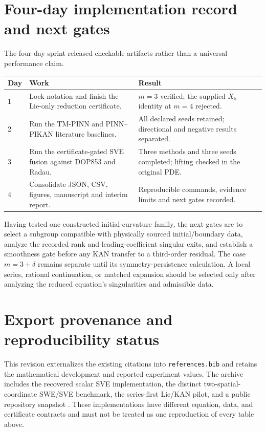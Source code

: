 \documentclass[11pt]{article}
\begin{document}
\section{Four-day implementation record and next gates}
The four-day sprint released checkable artifacts rather than a universal
performance claim.
\begin{center}
\small
\begin{tabularx}{\linewidth}{@{}lXX@{}}
\toprule
Day & Work & Result \\
\midrule
1 & Lock notation and finish the Lie-only reduction certificate. &
$m=3$ verified; the supplied $X_5$ identity at $m=4$ rejected. \\
2 & Run the TM-PINN and PINN--PIKAN literature baselines. &
All declared seeds retained; directional and negative results separated. \\
3 & Run the certificate-gated SVE fusion against DOP853 and Radau. &
Three methods and three seeds completed; lifting checked in the original PDE. \\
4 & Consolidate JSON, CSV, figures, manuscript and interim report. &
Reproducible commands, evidence limits and next gates recorded. \\
\bottomrule
\end{tabularx}
\end{center}
Having tested one constructed initial-curvature family, the next gates are to
select a subgroup compatible with physically sourced initial/boundary data,
analyze the recorded rank and leading-coefficient singular exits, and establish
a smoothness gate before any KAN transfer to a third-order residual. The case
$m=3+\delta$ remains separate until its symmetry-persistence calculation. A
local series, rational continuation, or matched expansion should be selected
only after analyzing the reduced equation's singularities and admissible data.


\section{Export provenance and reproducibility status}
This revision externalizes the existing citations into \texttt{references.bib}
and retains the mathematical development and reported experiment values.
The archive includes the recovered scalar SVE implementation, the distinct
two-spatial-coordinate SWE/SVE benchmark, the series-first Lie/KAN pilot,
and a public repository snapshot \cite{projectrepo}. These implementations
have different equation, data, and certificate contracts and must not be
treated as one reproduction of every table above.
\end{document}
